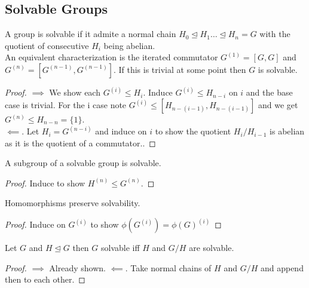 \subsection{Solvable Groups}
\begin{definition}
	A group is solvable if it admite a normal chain \(H_0 \trianglelefteq H_1 \ldots \trianglelefteq H_{n} = G\) with the quotient of consecutive \(H_{i}\) being abelian.\\
	An equivalent characterization is the iterated commutator \(G^{\left( 1 \right) } = \left[ G, G \right] \) and \(G^{\left( n \right) } = \left[ G^{\left( n-1 \right) }, G^{\left( n-1 \right) } \right] \). If this is trivial at some point then \(G\) is solvable.
\end{definition}
\begin{proof}
	\(\implies\)  We show each \(G^{\left( i \right) } \le H_{i}\). Induce \(G^{\left( i \right) } \le H_{n-i} \) on \(i\) and the base case is trivial. For the i case note \(G^{\left( i \right) }\le \left[ H_{n-\left( i-1 \right) }, H_{n-\left( i-1 \right) } \right] \) and we get \(G^{\left( n \right)} \le H_{n-n} = \{1\}  \).\\
	\(\impliedby\). Let \(H_{i} = G^{\left( n-i \right) }\) and induce on \(i\) to show the quotient \(H_{i} / H_{i-1}\) is abelian as it is the quotient of a commutator..
\end{proof}
\begin{theorem}
	A subgroup of a solvable group is solvable.
\end{theorem}
\begin{proof}
	Induce to show \(H^{\left( n \right) } \le G^{\left( n \right) }\).
\end{proof}
\begin{theorem}
	Homomorphisms preserve solvability.
\end{theorem}
\begin{proof}
	Induce on \(G^{\left( i \right) }\) to show \(\phi\left( G^{\left( i \right) } \right) = \phi\left( G \right) ^{\left( i \right) } \)
\end{proof}
\begin{theorem}
	Let \(G\) and \(H \trianglelefteq G\) then \(G\) solvable iff \(H\) and \(G / H\) are solvable.
\end{theorem}
\begin{proof}
	\(\implies\) Already shown.
	\(\impliedby\). Take normal chains of \(H\) and \(G / H\) and append then to each other.
\end{proof}
